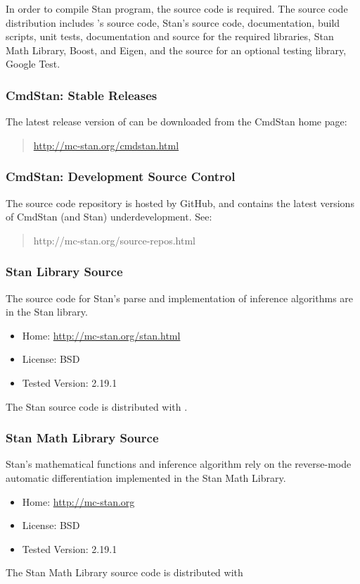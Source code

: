 In order to compile Stan program, the \CmdStan source code is
required.  The \CmdStan source code distribution includes \CmdStan's
source code, Stan's source code, documentation, build scripts, unit
tests, documentation and source for the required libraries, Stan Math
Library, Boost, and Eigen, and the source for an optional testing
library, Google Test.

\subsubsection{CmdStan: Stable Releases}

The latest release version of \CmdStan can be downloaded
from the CmdStan home page:
%
\begin{quote}
\url{http://mc-stan.org/cmdstan.html}
\end{quote}
%

\subsubsection{CmdStan: Development Source Control}

The source code repository is hosted by GitHub, and contains the
latest versions of CmdStan (and Stan) underdevelopment.  See:
%
\begin{quote}
http://mc-stan.org/source-repos.html
\end{quote}

\subsubsection{Stan Library Source}

The source code for Stan's parse and implementation of inference
algorithms are in the Stan library.
%
\begin{itemize}
\item Home: \url{http://mc-stan.org/stan.html}
\item License: BSD
\item Tested Version: 2.19.1
\end{itemize}
%
The Stan source code is distributed with \CmdStan.

\subsubsection{Stan Math Library Source}

Stan's mathematical functions and inference algorithm rely on the
reverse-mode automatic differentiation implemented in the Stan Math
Library.
%
\begin{itemize}
\item Home: \url{http://mc-stan.org}
\item License: BSD
\item Tested Version: 2.19.1
\end{itemize}
%
The Stan Math Library source code is distributed with \CmdStan

